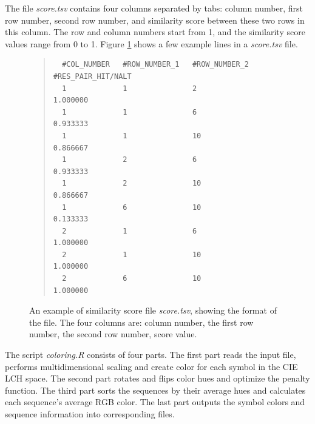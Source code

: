 The file \emph{score.tsv} contains four columns separated by tabs: column number, first row number, second row number, and similarity score between these two rows in this column. The row and column numbers start from 1, and the similarity score values range from 0 to 1. Figure \ref{fig:score.tsv} shows a few example lines in a \emph{score.tsv} file.
\begin{figure}[hbt]
\begin{quote}
\begin{verbatim}
  #COL_NUMBER   #ROW_NUMBER_1   #ROW_NUMBER_2   #RES_PAIR_HIT/NALT
  1             1               2               1.000000
  1             1               6               0.933333
  1             1               10              0.866667
  1             2               6               0.933333
  1             2               10              0.866667
  1             6               10              0.133333
  2             1               6               1.000000
  2             1               10              1.000000
  2             6               10              1.000000
\end{verbatim}
\end{quote}
\caption[Example of Similarity Score File]{An example of similarity score file \emph{score.tsv}, showing the format of the file. The four columns are: column number, the first row number, the second row number, score value.}\label{fig:score.tsv}
\end{figure}

The script \emph{coloring.R} consists of four parts. The first part reads the input file, performs multidimensional scaling and create color for each symbol in the CIE LCH space. The second part rotates and flips color hues and optimize the penalty function. The third part sorts the sequences by their average hues and calculates each sequence’s average RGB color. The last part outputs the symbol colors and sequence information into corresponding files.

